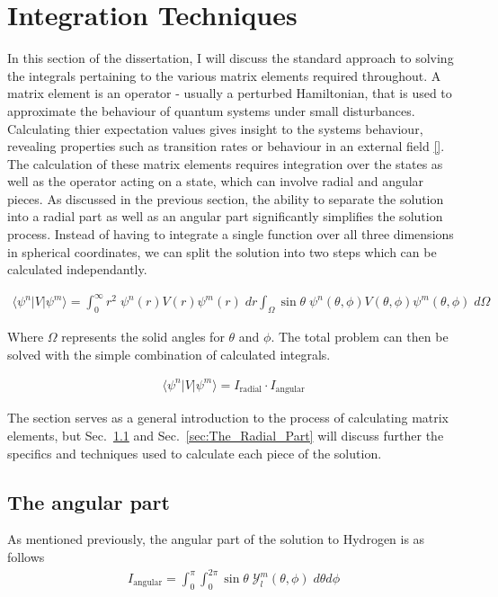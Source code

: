     \section{Integration Techniques} \label{sec:Integration_Techniques}
        In this section of the dissertation, I will discuss the standard approach to solving the integrals pertaining to the various matrix elements required throughout. A matrix element is an operator - usually a perturbed Hamiltonian, that is used to approximate the behaviour of quantum systems under small disturbances. Calculating thier expectation values gives insight to the systems behaviour, revealing properties such as transition rates or behaviour in an external field \ref{}. The calculation of these matrix elements requires integration over the states as well as the operator acting on a state, which can involve radial and angular pieces. As discussed in the previous section, the ability to separate the solution into a radial part as well as an angular part significantly simplifies the solution process. Instead of having to integrate a single function over all three dimensions in spherical coordinates, we can split the solution into two steps which can be calculated independantly.

        \begin{align}
            \langle \psi^n \vert V \vert \psi^m \rangle = \int_{0}^{\infty} r^2 \; \psi^n(r) V(r) \psi^m(r) \; dr \int_\Omega \sin \theta \; \psi^n(\theta, \phi) V(\theta, \phi) \psi^m(\theta, \phi) \; d\Omega
        \end{align}

        Where $\Omega$ represents the solid angles for $\theta$ and $\phi$. The total problem can then be solved with the simple combination of calculated integrals.

        \begin{align}
             \langle \psi^n \vert V \vert \psi^m \rangle = I_{\text{radial}} \cdot I_{\text{angular}}
        \end{align}

        The section serves as a general introduction to the process of calculating matrix elements, but Sec.~\ref{sec:The_Angular_Part} and Sec.~\ref{sec:The_Radial_Part} will discuss further the specifics and techniques used to calculate each piece of the solution.

        \subsection{The angular part} \label{sec:The_Angular_Part}
        As mentioned previously, the angular part of the solution to Hydrogen is as follows
        \begin{align}
            I_{\text{angular}} = \int_0^\pi \int_0^{2\pi}\sin \theta \;\mathcal{Y}^m_l (\theta, \phi) \; d\theta d\phi \label{eq:hydrogen_spherical_harmonic}
        \end{align}

